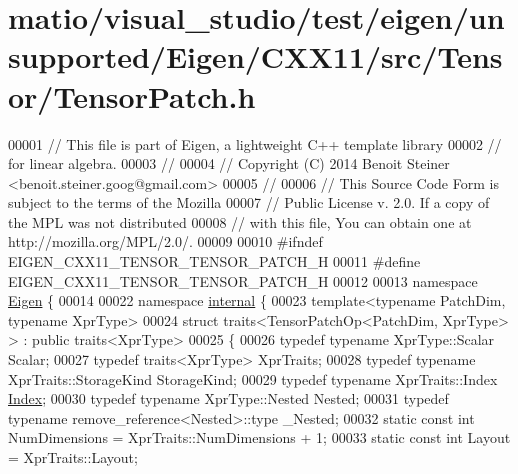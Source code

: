\hypertarget{matio_2visual__studio_2test_2eigen_2unsupported_2_eigen_2_c_x_x11_2src_2_tensor_2_tensor_patch_8h_source}{}\section{matio/visual\+\_\+studio/test/eigen/unsupported/\+Eigen/\+C\+X\+X11/src/\+Tensor/\+Tensor\+Patch.h}
\label{matio_2visual__studio_2test_2eigen_2unsupported_2_eigen_2_c_x_x11_2src_2_tensor_2_tensor_patch_8h_source}

\begin{DoxyCode}
00001 \textcolor{comment}{// This file is part of Eigen, a lightweight C++ template library}
00002 \textcolor{comment}{// for linear algebra.}
00003 \textcolor{comment}{//}
00004 \textcolor{comment}{// Copyright (C) 2014 Benoit Steiner <benoit.steiner.goog@gmail.com>}
00005 \textcolor{comment}{//}
00006 \textcolor{comment}{// This Source Code Form is subject to the terms of the Mozilla}
00007 \textcolor{comment}{// Public License v. 2.0. If a copy of the MPL was not distributed}
00008 \textcolor{comment}{// with this file, You can obtain one at http://mozilla.org/MPL/2.0/.}
00009 
00010 \textcolor{preprocessor}{#ifndef EIGEN\_CXX11\_TENSOR\_TENSOR\_PATCH\_H}
00011 \textcolor{preprocessor}{#define EIGEN\_CXX11\_TENSOR\_TENSOR\_PATCH\_H}
00012 
00013 \textcolor{keyword}{namespace }\hyperlink{namespace_eigen}{Eigen} \{
00014 
00022 \textcolor{keyword}{namespace }\hyperlink{namespaceinternal}{internal} \{
00023 \textcolor{keyword}{template}<\textcolor{keyword}{typename} PatchDim, \textcolor{keyword}{typename} XprType>
00024 \textcolor{keyword}{struct }traits<TensorPatchOp<PatchDim, XprType> > : \textcolor{keyword}{public} traits<XprType>
00025 \{
00026   \textcolor{keyword}{typedef} \textcolor{keyword}{typename} XprType::Scalar Scalar;
00027   \textcolor{keyword}{typedef} traits<XprType> XprTraits;
00028   \textcolor{keyword}{typedef} \textcolor{keyword}{typename} XprTraits::StorageKind StorageKind;
00029   \textcolor{keyword}{typedef} \textcolor{keyword}{typename} XprTraits::Index \hyperlink{namespace_eigen_a62e77e0933482dafde8fe197d9a2cfde}{Index};
00030   \textcolor{keyword}{typedef} \textcolor{keyword}{typename} XprType::Nested Nested;
00031   \textcolor{keyword}{typedef} \textcolor{keyword}{typename} remove\_reference<Nested>::type \_Nested;
00032   \textcolor{keyword}{static} \textcolor{keyword}{const} \textcolor{keywordtype}{int} NumDimensions = XprTraits::NumDimensions + 1;
00033   \textcolor{keyword}{static} \textcolor{keyword}{const} \textcolor{keywordtype}{int} Layout = XprTraits::Layout;

\end{DoxyCode}
